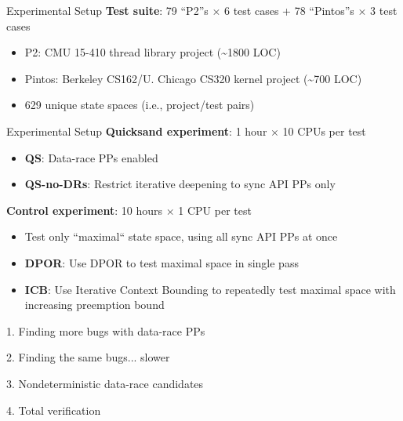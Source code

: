 \documentclass[xcolor=dvipsnames]{beamer}
\begin{document}
\begin{frame}{Experimental Setup}
	\textbf{Test suite}: 79 ``P2''s $\times$ 6 test cases + 78 ``Pintos''s $\times$ 3 test cases
	\begin{itemize}
		\item P2: CMU 15-410 thread library project (\textasciitilde{}1800 LOC)
		\item Pintos: Berkeley CS162/U. Chicago CS320 kernel project (\textasciitilde{}700 LOC)
		\item 629 unique state spaces (i.e., project/test pairs)
	\end{itemize}
\end{frame}
\begin{frame}{Experimental Setup}
	\textbf{Quicksand experiment}: 1 hour $\times$ 10 CPUs per test
	\begin{itemize}
		\item {\bf QS}: Data-race PPs enabled
		\item {\bf QS-no-DRs}: Restrict iterative deepening to sync API PPs only
	\end{itemize}
	\linegap

	{\bf Control experiment}: 10 hours $\times$ 1 CPU per test
	\begin{itemize}
		\item Test only ``maximal`` state space, using all sync API PPs at once
		\item {\bf DPOR}: Use DPOR to test maximal space in single pass
		\item {\bf ICB}: Use Iterative Context Bounding to repeatedly test maximal space with increasing preemption bound
	\end{itemize}
\end{frame}

\begin{frame}{1. Finding more bugs with data-race PPs}
\end{frame}

\begin{frame}{2. Finding the same bugs... slower}
\end{frame}

\begin{frame}{3. Nondeterministic data-race candidates}
\end{frame}

\begin{frame}{4. Total verification}
\end{frame}
\end{document}
